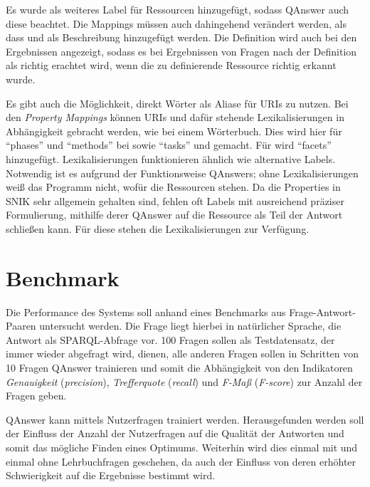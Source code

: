\documentclass[utf8,biblatex]{lni}
\begin{document}
Es wurde  als weiteres Label für Ressourcen hinzugefügt, sodass QAnswer auch diese beachtet.
Die Mappings müssen auch dahingehend verändert werden, als dass 
und  als Beschreibung hinzugefügt werden.
Die Definition wird auch bei den Ergebnissen angezeigt, sodass es bei Ergebnissen von Fragen nach der Definition als richtig erachtet wird, wenn die zu definierende Ressource richtig erkannt wurde.

Es gibt auch die Möglichkeit, direkt Wörter als Aliase für URIs zu nutzen.
Bei den \emph{Property Mappings} können URIs und dafür stehende Lexikalisierungen in Abhängigkeit gebracht werden, wie bei einem Wörterbuch.
Dies wird hier für \enquote{phases} und \enquote{methods} bei  sowie \enquote{tasks} und  gemacht.
Für  wird \enquote{facets} hinzugefügt.
Lexikalisierungen funktionieren ähnlich wie alternative Labels.
Notwendig ist es aufgrund der Funktionsweise QAnswers; ohne Lexikalisierungen weiß das Programm nicht, wofür die Ressourcen stehen.
Da die Properties in SNIK sehr allgemein gehalten sind, fehlen oft Labels mit ausreichend präziser Formulierung, mithilfe derer QAnswer auf die Ressource als Teil der Antwort schließen kann.
Für diese stehen die Lexikalisierungen zur Verfügung.

\section{Benchmark}

Die Performance des Systems soll anhand eines Benchmarks aus Frage-Antwort-Paaren untersucht werden.
Die Frage liegt hierbei in natürlicher Sprache, die Antwort als SPARQL-Abfrage vor.
100 Fragen sollen als Testdatensatz, der immer wieder abgefragt wird, dienen,
alle anderen Fragen sollen in Schritten von 10 Fragen QAnswer trainieren und somit die Abhängigkeit von den Indikatoren \emph{Genauigkeit} (\emph{precision}), \emph{Trefferquote} (\emph{recall}) und \emph{F-Maß} (\emph{F-score}) zur Anzahl der Fragen geben.

QAnswer kann mittels Nutzerfragen trainiert werden.
Herausgefunden werden soll der Einfluss der Anzahl der Nutzerfragen auf die Qualität der Antworten und somit das mögliche Finden eines Optimums.
Weiterhin wird dies einmal mit und einmal ohne Lehrbuchfragen geschehen, da auch der Einfluss von deren erhöhter Schwierigkeit auf die Ergebnisse bestimmt wird.
\end{document}
